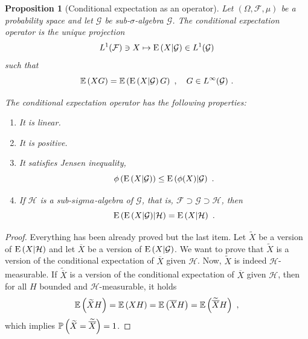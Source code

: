 \documentclass[12pt,a4paper]{amsart}
\theoremstyle{plain}%
\newtheorem{proposition}[thm]{Proposition}
\theoremstyle{definition}
\theoremstyle{remark}
\begin{document}
\begin{proposition}[Conditional expectation as an operator]\label{def:condexp3}
  Let $(\Omega,\mathcal F,\mu)$ be a probability space and let $\mathcal G$ be
  sub-$\sigma$-algebra $\mathcal G$. The \emph{conditional expectation
    operator} is the unique projection
  \begin{equation*}
    L^1(\mathcal F) \ni X \mapsto \operatorname{E}\left(X \middle| \mathcal G\right) \in
    L^1(\mathcal G)
  \end{equation*}
  such that
  \begin{equation*}
    \operatorname{\mathbb E}\left(XG\right) = \operatorname{\mathbb E}\left(\operatorname{E}\left(X \middle| \mathcal G\right)G\right) \ , \quad G
    \in L^\infty(\mathcal G) \ .
  \end{equation*}

  The conditional expectation operator has the following properties:
  \begin{enumerate}
  \item It is linear.
  \item It is positive.
  \item It satisfies Jensen inequality,
    \begin{equation*}
      \phi\left(\operatorname{E}\left(X \middle| \mathcal G\right)\right) \leq
      \operatorname{E}\left(\phi(X) \middle| \mathcal G\right) \ .
    \end{equation*}
\item If $\mathcal H$ is a sub-$sigma$-algebra of $\mathcal G$, that is,
  $\mathcal F \supset \mathcal G \supset \mathcal H$, then
  \begin{equation*}
    \operatorname{E}\left(\operatorname{E}\left(X \middle| \mathcal G\right) \middle| \mathcal H\right) = \operatorname{E}\left(X \middle| \mathcal H\right) \ .
  \end{equation*}
  \end{enumerate}
\end{proposition}

\begin{proof}
Everything has been already proved but the last item. Let $\widetilde
X$ be a version of $\operatorname{E}\left(X \middle| \mathcal H\right)$ and let $\overline X$ be
a version of $\operatorname{E}\left(X \middle| \mathcal G\right)$. We want to prove that
$\widetilde X$ is a version of the conditional expectation of
$\overline X$ given $\mathcal H$. Now, $\widetilde X$ is indeed
$\mathcal H$-measurable. If $\widetilde {\overline X}$ is a version of
the conditional expectation of $\overline X$ given $\mathcal H$, then
for all $H$ bounded and $\mathcal H$-measurable, it holds
\begin{equation*}
  \operatorname{\mathbb E}\left(\widetilde X  H\right) =  \operatorname{\mathbb E}\left(X H\right) = \operatorname{\mathbb E}\left(\overline
    X H\right) = \operatorname{\mathbb E}\left(\widetilde{\overline X}H\right) \ ,
\end{equation*}
which implies $\operatorname{\mathbb P}\left(\widetilde X = \widetilde{\overline X}\right) = 1$.
\end{proof}
\end{document}
